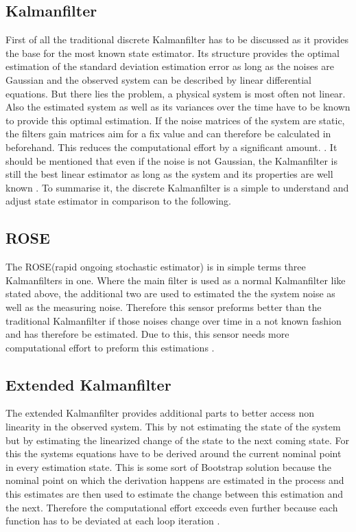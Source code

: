  \subsection{Kalmanfilter}
  First of all the traditional discrete Kalmanfilter has to be discussed as it provides the base for the most known state estimator.
  Its structure provides the optimal estimation of the standard deviation estimation error as long as the noises are Gaussian
  and the observed system can be described by linear differential equations.
  But there lies the problem, a physical system is most often not linear.
  Also the estimated system as well as its variances over the time have to be known to provide this optimal estimation.
  If the noise matrices of the system are static, the filters gain matrices aim for a fix value and can therefore be calculated in beforehand.
  This reduces the computational effort by a significant amount. \cite{DavidWSchultz2004}.
  It should be mentioned that even if the noise is not Gaussian, the Kalmanfilter is still the best
  linear estimator as long as the system and its properties are well known \cite{SimonDan2006Ose:}.
  To summarise it, the discrete Kalmanfilter is a simple to understand and adjust state estimator in comparison to the following.
  
  \subsection{ROSE}
  The ROSE(rapid ongoing stochastic estimator) is in simple terms three Kalmanfilters in one.
  Where the main filter is used as a normal Kalmanfilter like stated above, the additional two are used to estimated the 
  the system noise as well as the measuring noise. Therefore this sensor preforms better than the traditional Kalmanfilter
  if those noises change over time in a not known fashion and has therefore be estimated.
  Due to this, this sensor needs more computational effort to preform this estimations \cite{DavidWSchultz2004}. 
  
  \subsection{Extended Kalmanfilter}
  The extended Kalmanfilter provides additional parts to better access non linearity in the observed system.
  This by not estimating the state of the system but by estimating the linearized change of the state 
  to the next coming state. For this the systems equations have to be derived around the current nominal point in every estimation state.
  This is some sort of Bootstrap solution because the nominal point on which the derivation happens are estimated in the process and
  this estimates are then used to estimate the change between this estimation and the next.
  Therefore the computational effort exceeds even further because each function has to be deviated at each loop iteration \cite{SimonDan2006Ose:}.
  
